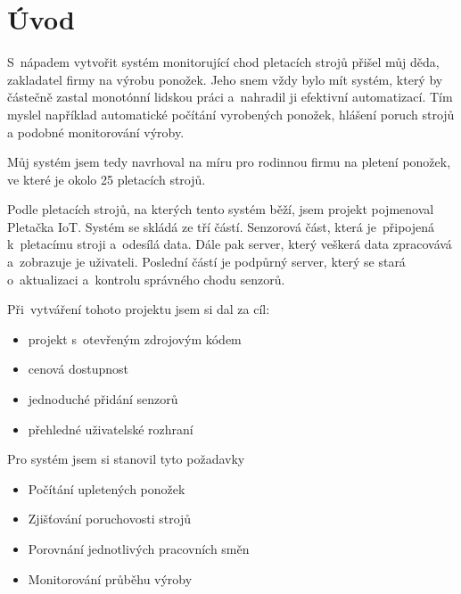\chapter*{Úvod}

S~nápadem vytvořit systém monitorující chod pletacích strojů přišel můj děda, zakladatel firmy na výrobu ponožek.
Jeho snem vždy bylo mít systém, který by částečně zastal monotónní lidskou práci a~nahradil ji efektivní automatizací.
Tím myslel například automatické počítání vyrobených ponožek, hlášení poruch strojů a podobné monitorování výroby.

Můj systém jsem tedy navrhoval na míru pro rodinnou firmu na pletení ponožek, ve které je okolo 25 pletacích strojů. 

Podle pletacích strojů, na kterých tento systém běží, jsem projekt pojmenoval Pletačka IoT. 
Systém se skládá ze tří částí.
Senzorová část, která je~připojená k~pletacímu stroji a~odesílá data.
Dále pak server, který veškerá data zpracovává a~zobrazuje je uživateli.
Poslední částí je podpůrný server, který se stará o~aktualizaci a~kontrolu správného chodu senzorů.\newline


Při~vytváření tohoto projektu jsem si dal za cíl:
\begin{itemize}
    \item projekt s~otevřeným zdrojovým kódem
    \item cenová dostupnost
    \item jednoduché přidání senzorů
    \item přehledné uživatelské rozhraní
\end{itemize}

\newpage
Pro systém jsem si stanovil tyto požadavky
\begin{itemize}
    \item Počítání upletených ponožek
    \item Zjišťování poruchovosti strojů
    \item Porovnání jednotlivých pracovních směn
    \item Monitorování průběhu výroby
\end{itemize}

